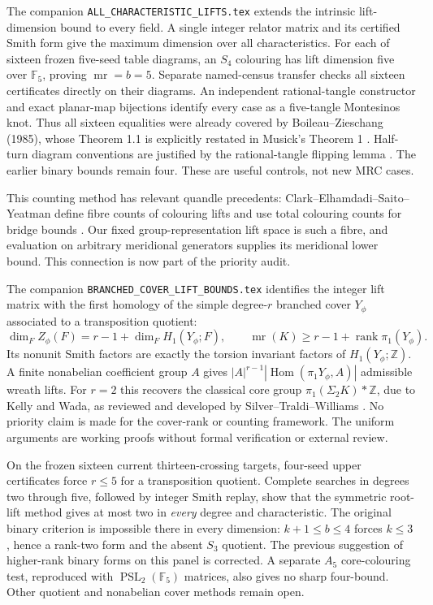\documentclass[11pt]{article}
\newcommand{\mr}{\operatorname{mr}}
\newcommand{\F}{\mathbb F}
\begin{document}
The companion \texttt{ALL\_CHARACTERISTIC\_LIFTS.tex} extends the intrinsic
lift-dimension bound to every field. A single integer relator matrix and
its certified Smith form give the maximum dimension over all
characteristics. For each of sixteen frozen five-seed table diagrams,
an $S_4$ colouring has lift dimension five over $\F_5$, proving
$\mr=b=5$. Separate named-census transfer checks all sixteen certificates
directly on their diagrams. An independent rational-tangle constructor
and exact planar-map bijections identify every case as a five-tangle
Montesinos knot. Thus all sixteen equalities were already covered by
Boileau--Zieschang (1985), whose Theorem 1.1 is explicitly restated in
Musick's Theorem 1 \cite{musick}. Half-turn diagram conventions are
justified by the rational-tangle flipping lemma \cite{kl}. The earlier
binary bounds remain four. These are useful controls, not new MRC cases.

This counting method has relevant quandle precedents:
Clark--Elhamdadi--Saito--Yeatman define fibre counts of colouring lifts
and use total colouring counts for bridge bounds \cite{cesy}. Our fixed
group-representation lift space is such a fibre, and evaluation on
arbitrary meridional generators supplies its meridional lower bound.
This connection is now part of the priority audit.

The companion \texttt{BRANCHED\_COVER\_LIFT\_BOUNDS.tex} identifies the
integer lift matrix with the first homology of the simple degree-$r$
branched cover $Y_\phi$ associated to a transposition quotient:
\[
 \dim_F Z_\phi(F)=r-1+\dim_F H_1(Y_\phi;F),\qquad
 \mr(K)\ge r-1+\operatorname{rank}\pi_1(Y_\phi).
\]
Its nonunit Smith factors are exactly the torsion invariant factors of
$H_1(Y_\phi;\mathbb Z)$. A finite nonabelian coefficient group $A$
gives $|A|^{r-1}|\operatorname{Hom}(\pi_1Y_\phi,A)|$ admissible wreath
lifts. For $r=2$ this recovers the classical core group
$\pi_1(\Sigma_2K)*\mathbb Z$, due to Kelly and Wada, as reviewed and
developed by Silver--Traldi--Williams \cite{core}. No priority claim is
made for the cover-rank or counting framework. The uniform arguments
are working proofs without formal verification or external review.

On the frozen sixteen current thirteen-crossing targets, four-seed
upper certificates force $r\le5$ for a transposition quotient.
Complete searches in degrees two through five, followed by integer
Smith replay, show that the symmetric root-lift method gives at most
two in \emph{every} degree and characteristic. The original binary
criterion is impossible there in every dimension: $k+1\le b\le4$
forces $k\le3$, hence a rank-two form and the absent $S_3$ quotient.
The previous suggestion of higher-rank binary forms on this panel
is corrected. A separate $A_5$ core-colouring test, reproduced with
$\operatorname{PSL}_2(\F_5)$ matrices, also gives no sharp four-bound.
Other quotient and nonabelian cover methods remain open.
\end{document}
